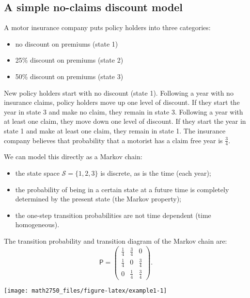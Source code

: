 \documentclass[
  a4paper,
]{article}
\providecommand{\tightlist}{%
  \setlength{\itemsep}{0pt}\setlength{\parskip}{0pt}}
\theoremstyle{definition}
\theoremstyle{definition}
\theoremstyle{definition}
\theoremstyle{remark}
\begin{document}
\hypertarget{S06-example1}{%
\subsection{A simple no-claims discount model}\label{S06-example1}}

A motor insurance company puts policy holders into three categories:

\begin{itemize}
\tightlist
\item
  no discount on premiums (state 1)
\item
  25\% discount on premiums (state 2)
\item
  50\% discount on premiums (state 3)
\end{itemize}

New policy holders start with no discount (state 1). Following a year with no insurance claims, policy holders move up one level of discount. If they start the year in state 3 and make no claim, they remain in state 3. Following a year with at least one claim, they move down one level of discount. If they start the year in state 1 and make at least one claim, they remain in state 1. The insurance company believes that probability that a motorist has a claim free year is \(\frac34\).

We can model this directly as a Markov chain:

\begin{itemize}
\tightlist
\item
  the state space \(\mathcal S = \{1,2,3\}\) is discrete, as is the time (each year);
\item
  the probability of being in a certain state at a future time is completely determined by the present state (the Markov property);
\item
  the one-step transition probabilities are not time dependent (time homogeneous).
\end{itemize}

The transition probability and transition diagram of the Markov chain are:
\[ \mathsf P = \begin{pmatrix} \frac14 & \frac34 & 0 \\ \frac14 & 0 & \frac34 \\ 0 & \frac14 & \frac34 \end{pmatrix} . \]

\begin{center}\texttt{[image: math2750\_files/figure-latex/example1-1]} \end{center}
\end{document}
